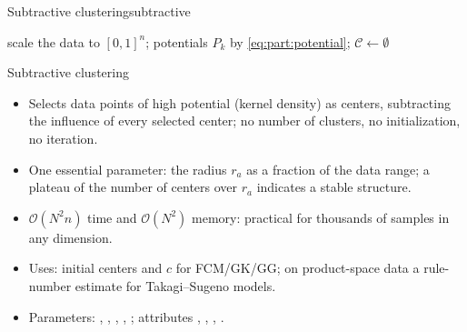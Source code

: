 \begin{algobox}{Subtractive clustering}{subtractive}
\begin{algorithm}[H]
scale the data to $[0,1]^n$; potentials $P_k$ by \eqref{eq:part:potential}; $\mathcal{C}\leftarrow\emptyset$\;
\end{algorithm}
\end{algobox}
\begin{summarybox}{Subtractive clustering}
\begin{itemize}
  \item Selects data points of high potential (kernel density) as centers, subtracting the influence of every selected center; no number of clusters, no initialization, no iteration.
  \item One essential parameter: the radius $r_a$ as a fraction of the data range; a plateau of the number of centers over $r_a$ indicates a stable structure.
  \item $\mathcal{O}(N^2n)$ time and $\mathcal{O}(N^2)$ memory: practical for thousands of samples in any dimension.
  \item Uses: initial centers and $c$ for FCM/GK/GG; on product-space data a rule-number estimate for Takagi--Sugeno models.
  \item Parameters: , , , , ; attributes , , , .
\end{itemize}
\end{summarybox}

